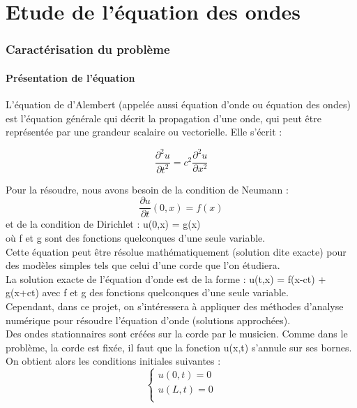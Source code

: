 \part{Etude de l'équation des ondes}

\section{Caractérisation du problème}

\subsection{Présentation de l'équation}

L'équation de d'Alembert (appelée aussi équation d'onde ou équation des ondes) est l'équation générale qui décrit la propagation d'une onde, qui peut être représentée par une grandeur scalaire ou vectorielle. 
Elle s'écrit : 

\begin{equation*}
\frac{\partial^2u}{\partial t^2} = c^{2}\frac{\partial^2u}{\partial x^2}
\end{equation*}
 
Pour la résoudre, nous avons besoin de la condition de Neumann :
\begin{equation*}
\frac{\partial u}{\partial t} (0,x) = f(x)
\end{equation*}
et de la condition de Dirichlet : u(0,x) = g(x)\\
où f et g sont des fonctions quelconques d'une seule variable.\\

Cette équation peut être résolue mathématiquement (solution dite exacte) pour des modèles simples tels que celui d'une corde que l'on étudiera.\\
La solution exacte de l'équation d'onde est de la forme :
u(t,x) = f(x-ct) + g(x+ct) avec f et g des fonctions quelconques d'une seule variable.  \\

Cependant, dans ce projet, on s'intéressera à appliquer des méthodes d'analyse numérique pour résoudre l'équation d'onde (solutions approchées).\\

Des ondes stationnaires sont créées sur la corde par le musicien. Comme dans le problème, la corde est fixée, il faut que la fonction u(x,t) s'annule sur ses bornes.\\
On obtient alors les conditions initiales suivantes :\\
\begin{equation*}
\left \{
\begin{array}{rcl}
u(0,t)=0\\
u(L,t)=0\\
\end{array}
\right.
\end{equation*}\\


